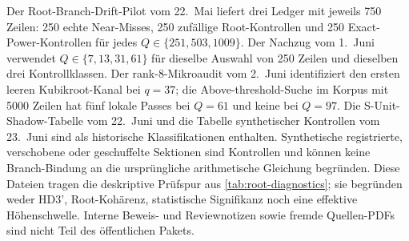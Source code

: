 \documentclass[11pt,a4paper]{article}
\begin{document}
Der Root-Branch-Drift-Pilot vom 22.~Mai liefert drei Ledger mit jeweils
750 Zeilen: 250 echte Near-Misses, 250 zufällige Root-Kontrollen und
250 Exact-Power-Kontrollen für jedes $Q\in\{251,503,1009\}$.
Der Nachzug vom 1.~Juni verwendet $Q\in\{7,13,31,61\}$ für dieselbe
Auswahl von 250 Zeilen und dieselben drei Kontrollklassen.
Der rank-8-Mikroaudit vom 2.~Juni identifiziert den ersten leeren
Kubikroot-Kanal bei $q=37$; die Above-threshold-Suche im Korpus mit
5000 Zeilen hat fünf lokale Passes bei $Q=61$ und keine bei $Q=97$.
Die S-Unit-Shadow-Tabelle vom 22.~Juni und die Tabelle synthetischer
Kontrollen vom 23.~Juni sind als historische Klassifikationen enthalten.
Synthetische registrierte, verschobene oder geschuffelte Sektionen
sind Kontrollen und können keine Branch-Bindung an die ursprüngliche
arithmetische Gleichung begründen.
Diese Dateien tragen die deskriptive Prüfspur aus
\cref{tab:root-diagnostics}; sie begründen weder HD3', Root-Kohärenz,
statistische Signifikanz noch eine effektive Höhenschwelle.
Interne Beweis- und Reviewnotizen sowie fremde Quellen-PDFs sind
nicht Teil des öffentlichen Pakets.


\end{document}
